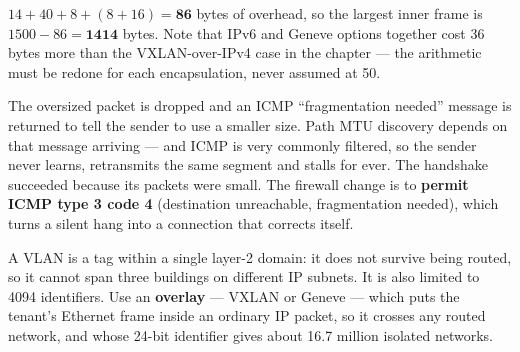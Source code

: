 \begin{ans}
  \item $14 + 40 + 8 + (8+16) = \mathbf{86}$ bytes of overhead, so the largest
        inner frame is $1500 - 86 = \mathbf{1414}$ bytes. Note that IPv6 and
        Geneve options together cost 36 bytes more than the VXLAN-over-IPv4 case
        in the chapter --- the arithmetic must be redone for each
        encapsulation, never assumed at 50.
  \item The oversized packet is dropped and an ICMP ``fragmentation needed''
        message is returned to tell the sender to use a smaller size. Path MTU
        discovery depends on that message arriving --- and ICMP is very commonly
        filtered, so the sender never learns, retransmits the same segment and
        stalls for ever. The handshake succeeded because its packets were small.
        The firewall change is to \textbf{permit ICMP type 3 code 4}
        (destination unreachable, fragmentation needed), which turns a silent
        hang into a connection that corrects itself.
  \item A VLAN is a tag within a single layer-2 domain: it does not survive
        being routed, so it cannot span three buildings on different IP subnets.
        It is also limited to 4094 identifiers. Use an \textbf{overlay} ---
        VXLAN or Geneve --- which puts the tenant's Ethernet frame inside an
        ordinary IP packet, so it crosses any routed network, and whose 24-bit
        identifier gives about 16.7 million isolated networks.
\end{ans}

